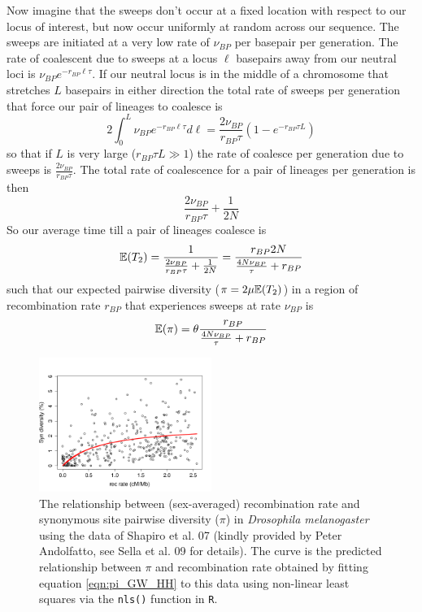 Now imagine that the sweeps don't occur at a fixed location with
respect to our locus of interest, but now occur uniformly at random
across our sequence. The sweeps are initiated at a very low rate of
$\nu_{BP}$ per basepair per generation. The rate of coalescent due to
sweeps at a locus $\ell$ basepairs away from our neutral loci is
$\nu_{BP} e^{-r_{BP} \ell \tau}$. If our neutral locus is in the
middle of a chromosome that stretches $L$ basepairs in either direction
the total rate of sweeps per generation that force our pair of lineages to coalesce is
\begin{equation}
2\int_0^{L} \nu_{BP} e^{-r_{BP} \ell \tau} d \ell =
\frac{2\nu_{BP}}{r_{BP} \tau} \left(1-e^{-r_{BP} \tau L} \right)
\end{equation}
so that if $L$ is very large ($r_{BP} \tau L \gg 1$) the rate of coalesce per
generation due to sweeps is $\frac{2\nu_{BP}}{r_{BP} \tau}$. The total rate
of coalescence for a pair of lineages per generation is then
\begin{equation}
\frac{2\nu_{BP}}{r_{BP} \tau}+\frac{1}{2N}
\end{equation}
So our average time till a pair of lineages coalesce is
\begin{equation}
\mathbb{E}(T_2) = \frac{1}{\frac{2\nu_{BP}}{r_{BP} \tau}+\frac{1}{2N}} = \frac{r_{BP}2N}{\frac{4N\nu_{BP}}{ \tau}+r_{BP}}
\end{equation}
such that our expected pairwise diversity ($\pi=2\mu\mathbb{E}(T_2)$) in a region of
recombination rate $r_{BP}$ that experiences sweeps at rate $\nu_{BP}$
is  
\begin{equation}
\mathbb{E}(\pi) = \theta \frac{r_{BP}}{\frac{4N\nu_{BP}}{ \tau}+r_{BP}} \label{eqn:pi_GW_HH}
\end{equation}


\begin{figure}
\begin{center}
\includegraphics[width=0.5\textwidth]{figures/Genomewide_HH.png}
\end{center}
\caption{The relationship between (sex-averaged) recombination rate and synonymous
  site pairwise diversity ($\pi$) in {\it Drosophila melanogaster}
  using the data of Shapiro et al. 07 (kindly provided by Peter
  Andolfatto, see Sella et al. 09 for details). The curve is the
  predicted relationship between $\pi$ and recombination rate obtained
  by fitting equation \eqref{eqn:pi_GW_HH} to this data 
 using non-linear least squares via the {\tt nls()} function in {\tt R}.} \label{fig:GW_hitchhiking_reduction}
\end{figure}



